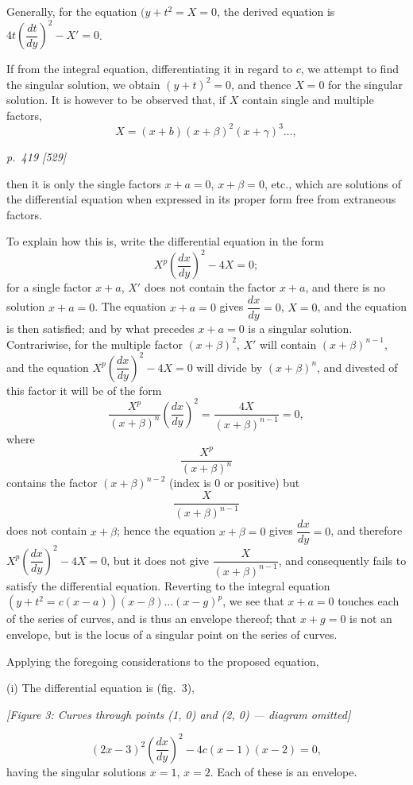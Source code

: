 \documentclass[11pt,a4paper]{book}
\begin{document}
Generally, for the equation $(y + t^2 = X = 0$, the derived equation is $4t\left(\dfrac{dt}{dy}\right)^2 - X' = 0$.

If from the integral equation, differentiating it in regard to $c$, we attempt to find the singular solution, we obtain $(y + t)^2 = 0$, and thence $X = 0$ for the singular solution. It is however to be observed that, if $X$ contain single and multiple factors,
\[
X = (x + b)(x + \beta)^2 (x + \gamma)^3 \ldots ,
\]

\clearpage

\bigskip
\textit{p.~419 [529]}
\smallskip

then it is only the single factors $x + a = 0$, $x + \beta = 0$, etc., which are solutions of the differential equation when expressed in its proper form free from extraneous factors.

To explain how this is, write the differential equation in the form
\[
X^p \left(\frac{dx}{dy}\right)^2 - 4X = 0;
\]
for a single factor $x + a$, $X'$ does not contain the factor $x + a$, and there is no solution $x + a = 0$. The equation $x + a = 0$ gives $\dfrac{dx}{dy} = 0$, $X = 0$, and the equation is then satisfied; and by what precedes $x + a = 0$ is a singular solution. Contrariwise, for the multiple factor $(x + \beta)^2$, $X'$ will contain $(x + \beta)^{n-1}$, and the equation $X^p\left(\dfrac{dx}{dy}\right)^2 - 4X = 0$ will divide by $(x + \beta)^n$, and divested of this factor it will be of the form
\[
\frac{X^p}{(x + \beta)^n}\left(\frac{dx}{dy}\right)^2 = \frac{4X}{(x + \beta)^{n-1}} = 0,
\]
where
\[
\frac{X^p}{(x + \beta)^n}
\]
contains the factor $(x + \beta)^{n-2}$ (index is 0 or positive) but
\[
\frac{X}{(x + \beta)^{n-1}}
\]
does not contain $x + \beta$; hence the equation $x + \beta = 0$ gives $\dfrac{dx}{dy} = 0$, and therefore $X^p\left(\dfrac{dx}{dy}\right)^2 - 4X = 0$, but it does not give $\dfrac{X}{(x + \beta)^{n-1}}$, and consequently fails to satisfy the differential equation. Reverting to the integral equation $(y + t^2 = c(x - a))(x - \beta)\ldots (x - g)^p$, we see that $x + a = 0$ touches each of the series of curves, and is thus an envelope thereof; that $x + g = 0$ is not an envelope, but is the locus of a singular point on the series of curves.

Applying the foregoing considerations to the proposed equation,

(i) The differential equation is (fig.~3),
\begin{center}
\textit{[Figure 3: Curves through points (1, 0) and (2, 0) --- diagram omitted]}
\end{center}
\[
(2x - 3)^2 \left(\frac{dx}{dy}\right)^2 - 4c(x - 1)(x - 2) = 0,
\]
having the singular solutions $x = 1$, $x = 2$. Each of these is an envelope.
\end{document}

